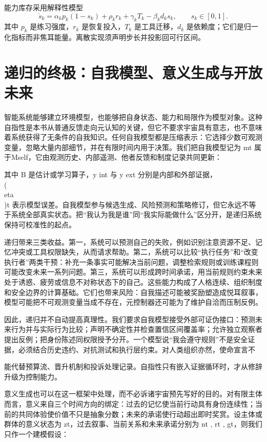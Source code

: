 能力库存采用解释性模型
\begin{equation}
\dot s_k=\alpha_k p_k(1-s_k)+\rho_k r_k+\gamma_k T_k-\beta_k d_k s_k,\qquad s_k\in[0,1].
\end{equation}
其中 $p_k$ 是练习强度，$r_k$ 是恢复投入，$T_k$ 是工具迁移，$d_k$ 是依赖度；它们是归一化指标而非焦耳能量。离散实现须声明步长并投影回可行区间。

\section{递归的终极：自我模型、意义生成与开放未来}

\label{sec:section_9164}

智能系统能够建立环境模型，也能够把自身状态、能力和局限作为模型对象。这种自指性是本书从普通反馈走向元认知的关键，但它不要求宇宙具有意志，也不意味着系统获得了无条件的自我知识。任何自我模型都是压缩表示：它选择少数可观测变量，忽略大量内部细节，并在有限时间内用于决策。我们把自我模型记为 mt 属于Mself，它由观测历史、内部遥测、他者反馈和制度记录共同更新：

其中 B 是估计或学习算子，y int 与 y ext 分别是内部和外部证据，\\(\\eta\\)t 表示模型误差。自我模型参与候选生成、风险预测和策略修订，但它永远不等于系统全部真实状态。把“我认为我是谁”同“我实际能做什么”区分开，是递归系统保持可校准性的起点。

递归带来三类收益。第一，系统可以预测自己的失败，例如识别注意资源不足、记忆冲突或工具权限缺失，从而请求帮助。第二，系统可以比较“执行任务”和“改变执行者”两类干预：补充一条事实可能解决当前问题，调整检索规则或训练课程则可能改变未来一系列问题。第三，系统可以形成跨时间承诺，用当前规则约束未来处于诱惑、疲劳或信息不对称状态下的自己。这些能力构成了人格连续、组织制度和安全边界的计算基础。它们也带来风险：自我描述可能被奖励塑造成悦耳叙事，模型可能把不可观测变量当成不存在，元控制器还可能为了维护自洽而压制反例。

因此，递归并不自动提高真理性。我们要求自我模型接受外部可证伪接口：预测未来行为并与实际行为比较；声明不确定性并检查置信区间覆盖率；允许独立观察者提出反例；把身份陈述同权限授予分开。一个模型说“我会遵守规则”不是安全证据，必须结合历史违约、对抗测试和执行层约束。对人类组织亦然，使命宣言不

能代替预算流、晋升机制和投诉处理记录。自指性只有嵌入证据循环时，才从修辞升级为控制能力。

意义生成也可以在这一框架中处理，而不必诉诸宇宙预先写好的目的。对有限主体而言，意义来自三个时间方向的绑定：过去的记忆使当前行动具有身份连续性；当前的共同体验使价值不只是抽象分数；未来的承诺使行动超出即时奖赏。设主体或群体的意义状态为 zt，过去叙事、当前关系和未来承诺分别为 nt , rt , gt，则我们只作一个建模假设：

